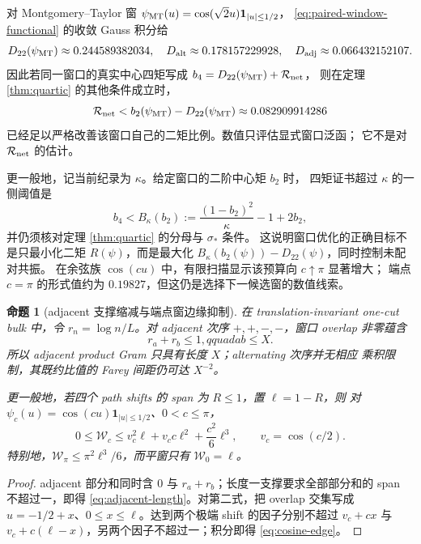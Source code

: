 \documentclass[UTF8,11pt,a4paper]{ctexart}
\newtheorem{proposition}[theorem]{命题}
\theoremstyle{definition}
\theoremstyle{remark}
\begin{document}
对 Montgomery--Taylor 窗
$\psi_{\rm MT}(u)=\cos(\sqrt2u)\mathbf1_{|u|\le1/2}$，
\eqref{eq:paired-window-functional} 的收敛 Gauss 积分给
\[
 D_{22}(\psi_{\rm MT})\approx0.244589382034,
\quad
 D_{\rm alt}\approx0.178157229928,\quad
 D_{\rm adj}\approx0.066432152107.
\]
因此若同一窗口的真实中心四矩写成
$b_4=D_{22}(\psi_{\rm MT})+\mathcal R_{\rm net}$，
则在定理 \ref{thm:quartic} 的其他条件成立时，
\[
 \mathcal R_{\rm net}
 <b_2(\psi_{\rm MT})-D_{22}(\psi_{\rm MT})
 \approx0.082909914286
 \label{eq:mt-fourth-budget}
\]
已经足以严格改善该窗口自己的二矩比例。数值只评估显式窗口泛函；
它不是对 $\mathcal R_{\rm net}$ 的估计。

更一般地，记当前纪录为 $\kappa$。给定窗口的二阶中心矩 $b_2$ 时，
四矩证书超过 $\kappa$ 的一侧阈值是
\[
 b_4<B_\kappa(b_2)
 :=\frac{(1-b_2)^2}{\kappa}-1+2b_2,
 \label{eq:general-window-threshold}
\]
并仍须核对定理 \ref{thm:quartic} 的分母与 $\sigma_*$ 条件。
这说明窗口优化的正确目标不是只最小化二矩 $R(\psi)$，而是最大化
$B_\kappa(b_2(\psi))-D_{22}(\psi)$，同时控制未配对共振。
在余弦族 $\cos(cu)$ 中，有限扫描显示该预算向 $c\uparrow\pi$ 显著增大；
端点 $c=\pi$ 的形式值约为 $0.19827$，但这仍是选择下一候选窗的数值线索。

\begin{proposition}[adjacent 支撑缩减与端点窗边缘抑制]
\label{prop:path-support}
在 translation-invariant one-cut bulk 中，令
$r_n=\log n/L$。对 adjacent 次序 $+,+,-,-$，窗口 overlap 非零蕴含
\[
 r_a+r_b\le1,qquad ab\le X.
 \label{eq:adjacent-length}
\]
所以 adjacent product Gram 只具有长度 $X$；alternating 次序并无相应
乘积限制，其既约比值的 Farey 间距仍可达 $X^{-2}$。

更一般地，若四个 path shifts 的 span 为 $R\le1$，置 $\ell=1-R$，则
对 $\psi_c(u)=\cos(cu)\mathbf1_{|u|\le1/2}$、$0<c\le\pi$，
\[
 0\le\mathcal W_c
 \le v_c^2\ell+v_cc\ell^2+\frac{c^2}{6}\ell^3,
 \qquad v_c=\cos(c/2).
 \label{eq:cosine-edge}
\]
特别地，$\mathcal W_\pi\le\pi^2\ell^3/6$，而平窗只有
$\mathcal W_0=\ell$。
\end{proposition}

\begin{proof}
adjacent 部分和同时含 $0$ 与 $r_a+r_b$；长度一支撑要求全部部分和的
span 不超过一，即得 \eqref{eq:adjacent-length}。对第二式，把 overlap
交集写成 $u=-1/2+x$、$0\le x\le\ell$。达到两个极端 shift 的因子分别不超过
$v_c+cx$ 与 $v_c+c(\ell-x)$，另两个因子不超过一；积分即得
\eqref{eq:cosine-edge}。
\end{proof}
\end{document}
